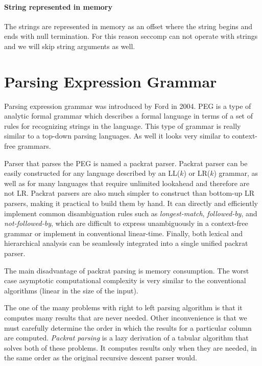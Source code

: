 \paragraph{String represented in memory}
The strings are represented in memory as an offset where the string
begins and ends with null termination.\cite{ISO9899} 
For this reason seccomp can not operate with strings and we will skip string arguments as well.

\section{Parsing Expression Grammar}
Parsing expression grammar was introduced by Ford in 2004.
PEG is a type of analytic formal grammar which describes a formal language in terms of a set of rules for recognizing strings in the language.
This type of grammar is really similar to a top-down parsing languages.
As well it looks very similar to context-free grammars.

Parser that parses the PEG is named a packrat parser.
Packrat parser can be easily constructed for any language described by an LL($k$) or LR($k$) grammar, as well as for many languages that require unlimited lookahead and therefore are not LR.
Packrat parsers are also much simpler to construct than bottom-up LR parsers, making it practical to build them by hand.
It can directly and efficiently implement common disambiguation rules such as \textit{longest-match}, \textit{followed-by}, and \textit{not-followed-by}, which are difficult to express unambiguously in a context-free grammar or implement in conventional linear-time.
Finally, both lexical and hierarchical analysis can be seamlessly integrated into a single unified packrat parser.

The main disadvantage of packrat parsing is memory consumption.
The worst case asymptotic computational complexity is very similar to the conventional algorithms (linear in the size of the input).

The one of the many problems with right to left parsing algorithm is that it computes many results that are never needed.
Other inconvenience is that we must carefully determine the order in which the results for a particular column are computed.
\textit{Packrat parsing} is a lazy derivation of a tabular algorithm that solves both of these problems.
It computes results only when they are needed, in the same order as the original recursive descent parser would.
\cite{Ford:PEG}

